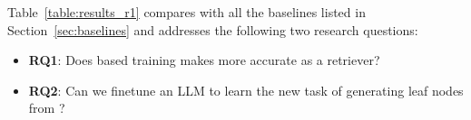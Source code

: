 Table~\ref{table:results_r1} compares {\sys} with all the baselines listed in Section~\ref{sec:baselines} and addresses the following two research questions:
\begin{itemize}
    \item \textbf{RQ1}: Does {\toc} based training makes {\sys} more accurate as a retriever?
    \item \textbf{RQ2}: Can we finetune an LLM to learn the new task of generating leaf nodes from {\toc}?
\end{itemize}

